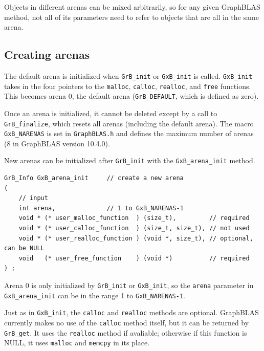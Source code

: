 Objects in different arenas can be mixed arbitrarily, so for any given
GraphBLAS method, not all of its parameters need to refer to objects that are
all in the same arena.

\subsection{Creating arenas}

The default arena is initialized when \verb'GrB_init' or \verb'GxB_init' is
called.  \verb'GxB_init' takes in the four pointers to the \verb'malloc',
\verb'calloc', \verb'realloc', and \verb'free' functions.  This becomes arena
0, the default arena (\verb'GrB_DEFAULT', which is defined as zero).

Once an arena is initialized, it cannot be deleted except by a call to
\verb'GrB_finalize', which resets all arenas (including the default arena).
The macro \verb'GxB_NARENAS' is set in \verb'GraphBLAS.h' and defines the
maximum number of arenas (8 in GraphBLAS version 10.4.0).

New arenas can be initialized after \verb'GrB_init' with the
\verb'GxB_arena_init' method.

\begin{mdframed}[userdefinedwidth=6in]
{\footnotesize
\begin{verbatim}
GrB_Info GxB_arena_init     // create a new arena
(
    // input
    int arena,              // 1 to GxB_NARENAS-1
    void * (* user_malloc_function  ) (size_t),         // required
    void * (* user_calloc_function  ) (size_t, size_t), // not used
    void * (* user_realloc_function ) (void *, size_t), // optional, can be NULL
    void   (* user_free_function    ) (void *)          // required
) ;
\end{verbatim}
}\end{mdframed}

Arena 0 is only initialized by
\verb'GrB_init' or \verb'GxB_init', so the \verb'arena' parameter in
\verb'GxB_arena_init' can be in the range 1 to \verb'GxB_NARENAS-1'.

Just as in \verb'GxB_init', the \verb'calloc' and \verb'realloc' methods are
optional.  GraphBLAS currently makes no use of the \verb'calloc' method itself,
but it can be returned by \verb'GrB_get'.  It uses the \verb'realloc' method if
avaliable; otherwise if this function is NULL, it uses \verb'malloc' and
\verb'memcpy' in its place.

